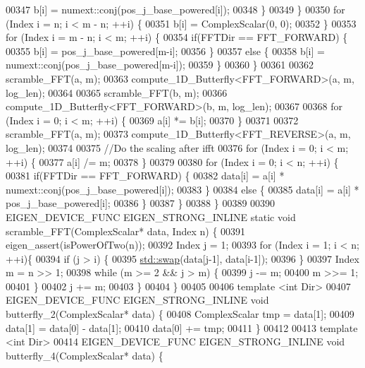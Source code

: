 \begin{DoxyCode}
00347         b[i] = numext::conj(pos\_j\_base\_powered[i]);
00348       \}
00349     \}
00350     \textcolor{keywordflow}{for} (Index i = n; i < m - n; ++i) \{
00351       b[i] = ComplexScalar(0, 0);
00352     \}
00353     \textcolor{keywordflow}{for} (Index i = m - n; i < m; ++i) \{
00354       \textcolor{keywordflow}{if}(FFTDir == FFT\_FORWARD) \{
00355         b[i] = pos\_j\_base\_powered[m-i];
00356       \}
00357       \textcolor{keywordflow}{else} \{
00358         b[i] = numext::conj(pos\_j\_base\_powered[m-i]);
00359       \}
00360     \}
00361 
00362     scramble\_FFT(a, m);
00363     compute\_1D\_Butterfly<FFT\_FORWARD>(a, m, log\_len);
00364 
00365     scramble\_FFT(b, m);
00366     compute\_1D\_Butterfly<FFT\_FORWARD>(b, m, log\_len);
00367 
00368     \textcolor{keywordflow}{for} (Index i = 0; i < m; ++i) \{
00369       a[i] *= b[i];
00370     \}
00371 
00372     scramble\_FFT(a, m);
00373     compute\_1D\_Butterfly<FFT\_REVERSE>(a, m, log\_len);
00374 
00375     \textcolor{comment}{//Do the scaling after ifft}
00376     \textcolor{keywordflow}{for} (Index i = 0; i < m; ++i) \{
00377       a[i] /= m;
00378     \}
00379 
00380     \textcolor{keywordflow}{for} (Index i = 0; i < n; ++i) \{
00381       \textcolor{keywordflow}{if}(FFTDir == FFT\_FORWARD) \{
00382         data[i] = a[i] * numext::conj(pos\_j\_base\_powered[i]);
00383       \}
00384       \textcolor{keywordflow}{else} \{
00385         data[i] = a[i] * pos\_j\_base\_powered[i];
00386       \}
00387     \}
00388   \}
00389 
00390   EIGEN\_DEVICE\_FUNC EIGEN\_STRONG\_INLINE \textcolor{keyword}{static} \textcolor{keywordtype}{void} scramble\_FFT(ComplexScalar* data, Index n) \{
00391     eigen\_assert(isPowerOfTwo(n));
00392     Index j = 1;
00393     \textcolor{keywordflow}{for} (Index i = 1; i < n; ++i)\{
00394       \textcolor{keywordflow}{if} (j > i) \{
00395         \hyperlink{endian_8c_a3ca5ecd34b04d6a243c054ac3a57f68d}{std::swap}(data[j-1], data[i-1]);
00396       \}
00397       Index m = n >> 1;
00398       \textcolor{keywordflow}{while} (m >= 2 && j > m) \{
00399         j -= m;
00400         m >>= 1;
00401       \}
00402       j += m;
00403     \}
00404   \}
00405 
00406   \textcolor{keyword}{template} <\textcolor{keywordtype}{int} Dir>
00407   EIGEN\_DEVICE\_FUNC EIGEN\_STRONG\_INLINE \textcolor{keywordtype}{void} butterfly\_2(ComplexScalar* data) \{
00408     ComplexScalar tmp = data[1];
00409     data[1] = data[0] - data[1];
00410     data[0] += tmp;
00411   \}
00412 
00413   \textcolor{keyword}{template} <\textcolor{keywordtype}{int} Dir>
00414   EIGEN\_DEVICE\_FUNC EIGEN\_STRONG\_INLINE \textcolor{keywordtype}{void} butterfly\_4(ComplexScalar* data) \{

\end{DoxyCode}
